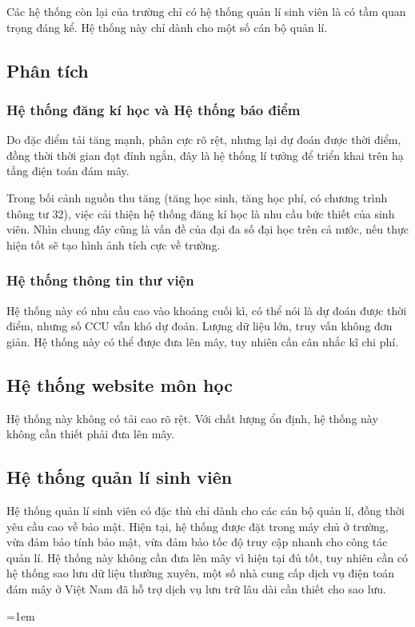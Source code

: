 \documentclass{article}
\begin{document}
Các hệ thống còn lại của trường chỉ có hệ thống quản lí sinh viên là có tầm quan
trọng đáng kể. Hệ thống này chỉ dành cho một số cán bộ quản lí.

\subsection{Phân tích}

\subsubsection{Hệ thống đăng kí học và Hệ thống báo điểm}

Do đặc điểm tải tăng mạnh, phân cực rõ rệt, nhưng lại dự đoán được thời điểm,
đồng thời thời gian đạt đỉnh ngắn, đây là hệ thống lí tưởng để triển khai trên
hạ tầng điện toán đám mây.

Trong bối cảnh nguồn thu tăng (tăng học sinh, tăng học phí, có chương trình
thông tư 32), việc cải thiện hệ thống đăng kí học là nhu cầu bức thiết của sinh
viên. Nhìn chung đây cũng là vấn đề của đại đa số đại học trên cả nước, nếu thực
hiện tốt sẽ tạo hình ảnh tích cực về trường.

\subsubsection{Hệ thống thông tin thư viện}

Hệ thống này có nhu cầu cao vào khoảng cuối kì, có thể nói là dự đoán được thời
điểm, nhưng số CCU vẫn khó dự đoán. Lượng dữ liệu lớn, truy vấn không đơn giản.
Hệ thống này có thể được đưa lên mây, tuy nhiên cần cân nhắc kĩ chi phí.

\subsection{Hệ thống website môn học}

Hệ thống này không có tải cao rõ rệt. Với chất lượng ổn định, hệ thống này không
cần thiết phải đưa lên mây.

\subsection{Hệ thống quản lí sinh viên}

Hệ thống quản lí sinh viên có đặc thù chỉ dành cho các cán bộ quản lí, đồng thời
yêu cầu cao về bảo mật. Hiện tại, hệ thống được đặt trong máy chủ ở trường, vừa
đảm bảo tính bảo mật, vừa đảm bảo tốc độ truy cập nhanh cho công tác quản lí. Hệ
thống này không cần đưa lên mây vì hiện tại đủ tốt, tuy nhiên cần có hệ thống
sao lưu dữ liệu thường xuyên, một số nhà cung cấp dịch vụ điện toán đám mây ở
Việt Nam đã hỗ trợ dịch vụ lưu trữ lâu dài cần thiết cho sao lưu.

\emergencystretch=1em
\printbibliography[title={Tài liệu tham khảo}]
\end{document}
